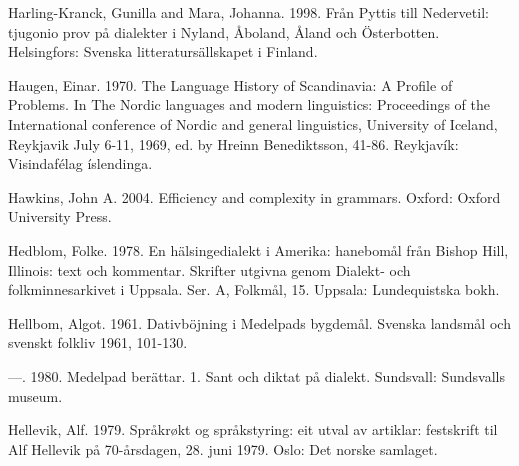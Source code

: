 \begin{styleBodytextC}
Harling-Kranck, Gunilla and Mara, Johanna. 1998. Från Pyttis till Nedervetil: tjugonio prov på dialekter i Nyland, Åboland, Åland och Österbotten. Helsingfors: Svenska litteratursällskapet i Finland.

\end{styleBodytextC}

\begin{styleBodytextC}
Haugen, Einar. 1970. The Language History of Scandinavia: A Profile of Problems. In The Nordic languages and modern linguistics: Proceedings of the International conference of Nordic and general linguistics, University of Iceland, Reykjavik July 6-11, 1969, ed. by Hreinn Benediktsson, 41-86. Reykjavík: Visindafélag íslendinga. 

\end{styleBodytextC}

\begin{styleBodytextC}
Hawkins, John A. 2004. Efficiency and complexity in grammars. Oxford: Oxford University Press.

\end{styleBodytextC}

\begin{styleBodytextC}
Hedblom, Folke. 1978. En hälsingedialekt i Amerika: hanebomål från Bishop Hill, Illinois: text och kommentar. Skrifter utgivna genom Dialekt- och folkminnesarkivet i Uppsala. Ser. A, Folkmål, 15. Uppsala: Lundequistska bokh.

\end{styleBodytextC}

\begin{styleBodytextC}
Hellbom, Algot. 1961. Dativböjning i Medelpads bygdemål. Svenska landsmål och svenskt folkliv 1961, 101-130.

\end{styleBodytextC}

\begin{styleBodytextC}
—. 1980. Medelpad berättar. 1. Sant och diktat på dialekt. Sundsvall: Sundsvalls museum.

\end{styleBodytextC}

\begin{styleBodytextC}
Hellevik, Alf. 1979. Språkrøkt og språkstyring: eit utval av artiklar: festskrift til Alf Hellevik på 70-årsdagen, 28. juni 1979. Oslo: Det norske samlaget.

\end{styleBodytextC}

